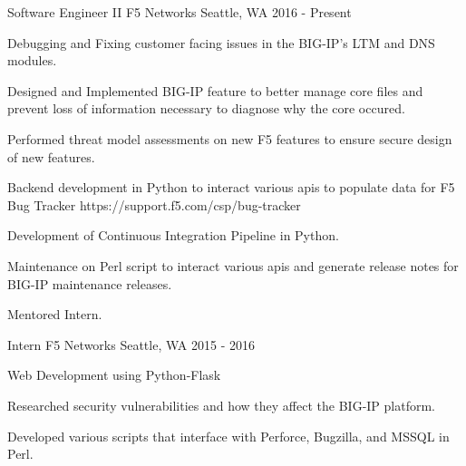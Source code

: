 

\begin{cventries}

  \cventry
    {Software Engineer II} %
    {F5 Networks} %
    {Seattle, WA} %
    {2016 - Present} %
    {
      \begin{cvitems} %
        \item {Debugging and Fixing customer facing issues in the BIG-IP's LTM and DNS modules.}
        \item {Designed and Implemented BIG-IP feature to better manage core files and prevent loss of information necessary to diagnose why the core occured.}
        \item {Performed threat model assessments on new F5 features to ensure secure design of new features.}
        \item {Backend development in Python to interact various apis to populate data for F5 Bug Tracker https://support.f5.com/csp/bug-tracker}
        \item {Development of Continuous Integration Pipeline in Python.}
        \item {Maintenance on Perl script to interact various apis and generate release notes for BIG-IP maintenance releases.}
        \item {Mentored Intern.}
      \end{cvitems}
    }

  \cventry
    {Intern} %
    {F5 Networks} %
    {Seattle, WA} %
    {2015 - 2016} %
    {
      \begin{cvitems} %
        \item {Web Development using Python-Flask}
        \item {Researched security vulnerabilities and how they affect the BIG-IP platform.}
        \item {Developed various scripts that interface with Perforce, Bugzilla, and MSSQL in Perl.}
      \end{cvitems}
    }


\end{cventries}
